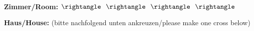 \documentclass[a4paper,10pt]{scrartcl}
\begin{document}
{\begin{tabbing}
	\\
        \bfseries {\large Zimmer/Room:} \>
	{\underline {\TextField[name=zimmer, bordercolor=white, width=2.4em, maxlen=4, borderwidth=0]{}}}
	{\color{gray} $\rightangle \hspace{.7em} \rightangle \hspace{.7em} \rightangle \hspace{.7em} \rightangle$} \\
\end{tabbing}
}
\vspace{-10pt}

\vfill

\LARGE \textbf{Haus/House:} \hspace*{10pt} \large{(bitte nachfolgend unten ankreuzen/please make one cross below)} \\
\vspace{-10pt}
\end{document}
